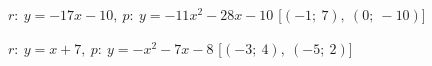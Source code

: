 \begin{esercizio}
\begin{enumeratea}
% 
% 
  \item  \(r:~y = -17 x -10,~p:~y=-11 x^2 -28 x -10\)
   \hfill [\(\left (-1;~7 \right ),~\left (0;~-10 \right )\)]
  \item  \(r:~y = x +7,~p:~y=- x^2 -7 x -8\)
   \hfill [\(\left (-3;~4 \right ),~\left (-5;~2 \right )\)]

\end{enumeratea}
\end{esercizio}
